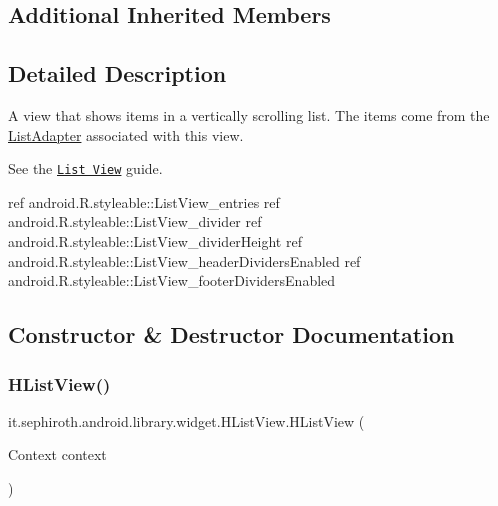 \subsection*{Additional Inherited Members}


\subsection{Detailed Description}
A view that shows items in a vertically scrolling list. The items come from the \hyperlink{}{List\+Adapter} associated with this view.

See the \href{{@docRoot}guide/topics/ui/layout/listview.html}{\tt List View} guide. 

ref android.\+R.\+styleable\+::\+List\+View\+\_\+entries  ref android.\+R.\+styleable\+::\+List\+View\+\_\+divider  ref android.\+R.\+styleable\+::\+List\+View\+\_\+divider\+Height  ref android.\+R.\+styleable\+::\+List\+View\+\_\+header\+Dividers\+Enabled  ref android.\+R.\+styleable\+::\+List\+View\+\_\+footer\+Dividers\+Enabled 

\subsection{Constructor \& Destructor Documentation}
\mbox{\label{classit_1_1sephiroth_1_1android_1_1library_1_1widget_1_1_h_list_view_a2360ad04939c1cea605001191eab9c2c}} 
\subsubsection{\texorpdfstring{H\+List\+View()}{HListView()}\hspace{0.1cm}{\footnotesize\ttfamily [1/3]}}
{\footnotesize\ttfamily it.\+sephiroth.\+android.\+library.\+widget.\+H\+List\+View.\+H\+List\+View (\begin{DoxyParamCaption}\item[{Context}]{context }\end{DoxyParamCaption})}

\mbox{\label{classit_1_1sephiroth_1_1android_1_1library_1_1widget_1_1_h_list_view_afb5b48d4f924286c9faf1c7ad0c86a56}} 
